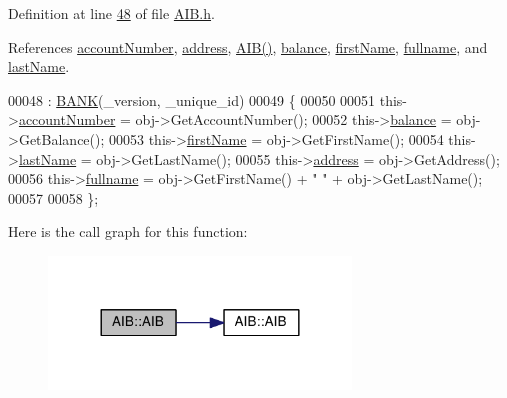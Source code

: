 Definition at line \hyperlink{_a_i_b_8h_source_l00048}{48} of file \hyperlink{_a_i_b_8h_source}{A\+I\+B.\+h}.



References \hyperlink{_a_i_b_8h_source_l00100}{account\+Number}, \hyperlink{_a_i_b_8h_source_l00102}{address}, \hyperlink{_a_i_b_8h_source_l00023}{A\+I\+B()}, \hyperlink{_a_i_b_8h_source_l00101}{balance}, \hyperlink{_a_i_b_8h_source_l00098}{first\+Name}, \hyperlink{_a_i_b_8h_source_l00097}{fullname}, and \hyperlink{_a_i_b_8h_source_l00099}{last\+Name}.


\begin{DoxyCode}
00048                                                               : \hyperlink{class_b_a_n_k_a0bc938356cebff14fb0560264abe5a34_a0bc938356cebff14fb0560264abe5a34}{BANK}(\_version, \_unique\_id)
00049     \{
00050         
00051         this->\hyperlink{class_a_i_b_aafc08efeec5b8c800c32ee32f20603a7_aafc08efeec5b8c800c32ee32f20603a7}{accountNumber} = obj->GetAccountNumber();
00052         this->\hyperlink{class_a_i_b_a3c8d637bd997c1f062d844a88e2559ba_a3c8d637bd997c1f062d844a88e2559ba}{balance} = obj->GetBalance();
00053         this->\hyperlink{class_a_i_b_a869f72057cb63ebf0cfd257069e15c7c_a869f72057cb63ebf0cfd257069e15c7c}{firstName} = obj->GetFirstName();
00054         this->\hyperlink{class_a_i_b_ace7b8b648d1b44b7ee2f4be002952b7a_ace7b8b648d1b44b7ee2f4be002952b7a}{lastName} = obj->GetLastName();
00055         this->\hyperlink{class_a_i_b_ae6a67cc33d1e5fa83a52a238e45ca3dc_ae6a67cc33d1e5fa83a52a238e45ca3dc}{address} = obj->GetAddress();
00056         this->\hyperlink{class_a_i_b_a818b0cc283af23127c067fb3fc751058_a818b0cc283af23127c067fb3fc751058}{fullname} = obj->GetFirstName() + \textcolor{stringliteral}{" "} + obj->GetLastName(); 
00057         
00058     \};
\end{DoxyCode}


Here is the call graph for this function\+:\nopagebreak
\begin{figure}[H]
\begin{center}
\leavevmode
\includegraphics[width=228pt]{class_a_i_b_aa0faccb7aadf423d12bddb2469ff5053_aa0faccb7aadf423d12bddb2469ff5053_cgraph}
\end{center}
\end{figure}


